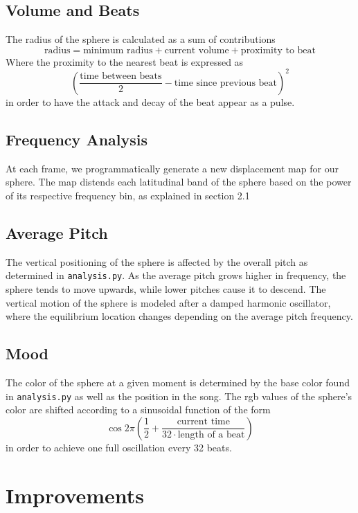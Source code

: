 \documentclass{article}
\newcommand{\code}{\texttt}
\begin{document}
    \subsection{Volume and Beats}
    The radius of the sphere is calculated as a sum of contributions
    $$\text{radius} = \text{minimum radius} + \text{current volume} + \text{proximity to beat}$$
    Where the proximity to the nearest beat is expressed as
    $$\left( \frac{\text{time between beats}}{2} - \text{time since previous beat} \right)^2$$
    in order to have the attack and decay of the beat appear as a pulse.

    \subsection{Frequency Analysis}
    At each frame, we programmatically generate a new displacement map for our sphere. The map distends each latitudinal band of the sphere based on the power of its respective frequency bin, as explained in section 2.1

    \subsection{Average Pitch}
    The vertical positioning of the sphere is affected by the overall pitch as determined in \code{analysis.py}. As the average pitch grows higher in frequency, the sphere tends to move upwards, while lower pitches cause it to descend. The vertical motion of the sphere is modeled after a damped harmonic oscillator, where the equilibrium location changes depending on the average pitch frequency.

    \subsection{Mood}
    The color of the sphere at a given moment is determined by the base color found in \code{analysis.py} as well as the position in the song. The rgb values of the sphere's color are shifted according to a sinusoidal function of the form
    $$\cos 2 \pi \left( \frac{1}{2} + \frac{\text{current time}}{32 \cdot \text{length of a beat}} \right)$$
    in order to achieve one full oscillation every 32 beats.

\section{Improvements}
\end{document}
